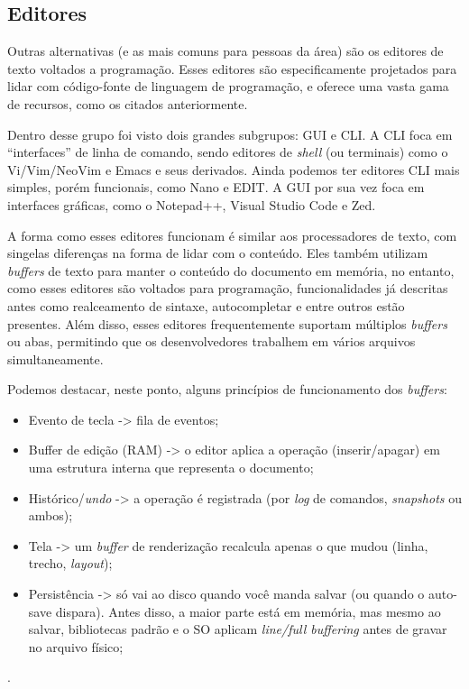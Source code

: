 \subsection{Editores}

Outras alternativas (e as mais comuns para pessoas da área) são os editores
de texto voltados a programação. Esses editores são especificamente projetados
para lidar com código-fonte de linguagem de programação, e oferece uma vasta gama
de recursos, como os citados anteriormente.

Dentro desse grupo foi visto dois grandes subgrupos: GUI e CLI. A CLI foca em ``interfaces''
de linha de comando, sendo editores de \textit{shell} (ou terminais) como o Vi/Vim/NeoVim
e Emacs e seus derivados. Ainda podemos ter editores CLI mais simples, porém
funcionais, como Nano e EDIT. A GUI por sua vez foca em interfaces gráficas, como
o Notepad++, Visual Studio Code e Zed.

A forma como esses editores funcionam é similar aos processadores de texto, com singelas
diferenças na forma de lidar com o conteúdo. Eles também utilizam \textit{buffers}
de texto para manter o conteúdo do documento em memória, no entanto, como esses editores
são voltados para programação, funcionalidades já descritas antes como
realceamento de sintaxe, autocompletar e entre outros estão presentes. Além
disso, esses editores frequentemente suportam múltiplos \textit{buffers} ou abas,
permitindo que os desenvolvedores trabalhem em vários arquivos simultaneamente.

Podemos destacar, neste ponto, alguns princípios de funcionamento dos \textit{buffers}:

\begin{itemize}
    \item Evento de tecla -> fila de eventos;

    \item Buffer de edição (RAM) -> o editor aplica a operação (inserir/apagar)
        em uma estrutura interna que representa o documento;

    \item Histórico/\textit{undo} -> a operação é registrada (por \textit{log} de
        comandos, \textit{snapshots} ou ambos);

    \item Tela -> um \textit{buffer} de renderização recalcula apenas o que mudou
        (linha, trecho, \textit{layout});

    \item Persistência -> só vai ao disco quando você manda salvar (ou quando o auto-save
        dispara). Antes disso, a maior parte está em memória, mas mesmo ao salvar,
        bibliotecas padrão e o SO aplicam \textit{line/full buffering} antes de gravar
        no arquivo físico;
\end{itemize}
\cite{glibc-buffering-concepts}.

